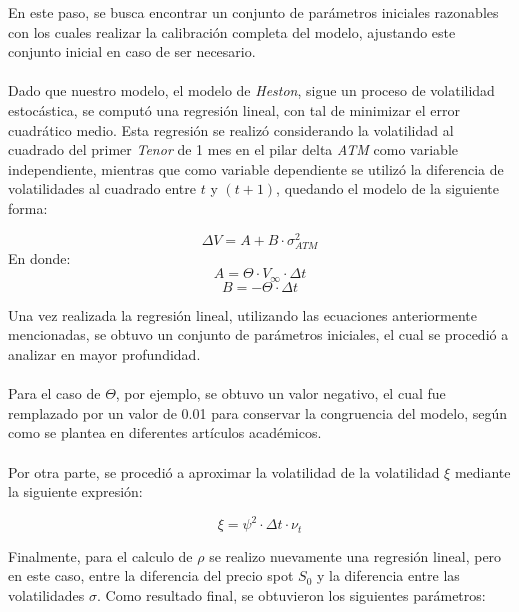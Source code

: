 \indent En este paso, se busca encontrar un conjunto de parámetros iniciales razonables con los cuales realizar la calibración completa del modelo, ajustando este conjunto inicial en caso de ser necesario.\\\\
\noindent Dado que nuestro modelo, el modelo de \textit{Heston}, sigue un proceso de volatilidad estocástica, se computó una regresión lineal, con tal de minimizar el error cuadrático  medio. Esta regresión se realizó considerando la volatilidad al cuadrado del primer \textit{Tenor} de 1 mes en el pilar delta \textit{ATM} como variable independiente, mientras que como variable dependiente se utilizó la diferencia de volatilidades al cuadrado entre $t$ y $(t+1)$, quedando el modelo de la siguiente forma:

\begin{equation}
      \Delta V=A+B\cdot{\sigma}^2_{ATM}
\end{equation}
\noindent En donde:
\begin{equation*}
    A=\Theta\cdot V_{\infty} \cdot \Delta t
\end{equation*}
\begin{equation*}
    B=-\Theta \cdot \Delta t
\end{equation*}

\noindent Una vez realizada la regresión lineal, utilizando las ecuaciones anteriormente mencionadas, se obtuvo un conjunto de parámetros iniciales, el cual se procedió a analizar en mayor profundidad.\\\\
\noindent Para el caso de $\Theta$, por ejemplo, se obtuvo un valor negativo, el cual fue remplazado por un valor de 0.01 para conservar la congruencia del modelo, según como se plantea en diferentes artículos académicos.\\\\
\noindent Por otra parte, se procedió a aproximar la volatilidad de la volatilidad $\xi$ mediante la siguiente expresión:

\begin{equation}
    \xi=\psi^2 \cdot \Delta t \cdot \nu_t
\end{equation}

\noindent Finalmente, para el calculo de $\rho$ se realizo nuevamente una regresión lineal, pero en este caso, entre la diferencia del precio spot $S_0$ y la diferencia entre las volatilidades $\sigma$. Como resultado final, se obtuvieron los siguientes parámetros:

